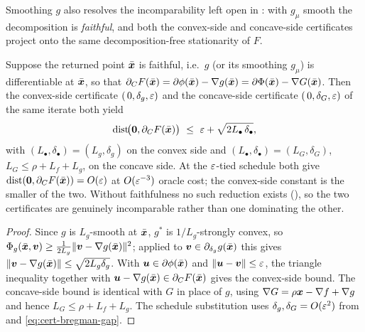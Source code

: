Smoothing $g$ also resolves the incomparability left open in
: with $g_\mu$ smooth the decomposition is
\emph{faithful}, and both the convex-side and concave-side certificates
project onto the same decomposition-free stationarity of $F$.

\begin{corollary}
\label{cor:decomp-free-clarke}
Suppose the returned point $\bar{\bm{x}}$ is faithful, i.e.\ $g$ (or its
smoothing $g_\mu$) is differentiable at $\bar{\bm{x}}$, so that
$\partial_C F(\bar{\bm{x}})=\partial\phi(\bar{\bm{x}})-\nabla g(\bar{\bm{x}})
=\partial\Phi(\bar{\bm{x}})-\nabla G(\bar{\bm{x}})$. Then the convex-side certificate
$(\,0,\delta_g,\varepsilon)$ and the concave-side certificate $(\,0,\delta_G,\varepsilon)$
of the same iterate both yield
\[
    \operatorname{dist}\!\bigl(\bm{0},\partial_C F(\bar{\bm{x}})\bigr)
    \ \le\
    \varepsilon+\sqrt{2L_\bullet\,\delta_\bullet},
\]
with $(L_\bullet,\delta_\bullet)=(L_g,\delta_g)$ on the convex side and
$(L_\bullet,\delta_\bullet)=(L_G,\delta_G)$, $L_G\le\rho+L_f+L_g$, on the
concave side. At the $\varepsilon$-tied schedule both give
$\operatorname{dist}(\bm{0},\partial_C F(\bar{\bm{x}}))=O(\varepsilon)$ at $O(\varepsilon^{-3})$
oracle cost; the convex-side constant is the smaller of the two. Without
faithfulness no such reduction exists
(), so the two certificates are
genuinely incomparable rather than one dominating the other.
\end{corollary}

\begin{proof}
Since $g$ is $L_g$-smooth at $\bar{\bm{x}}$, $g^*$ is $1/L_g$-strongly convex,
so $\Phi_g(\bar{\bm{x}},\bm{v})\ge\tfrac1{2L_g}\lVert \bm{v}-\nabla g(\bar{\bm{x}})\rVert^2$;
applied to $\bm{v}\in\partial_{\delta_g}g(\bar{\bm{x}})$ this gives
$\lVert \bm{v}-\nabla g(\bar{\bm{x}})\rVert\le\sqrt{2L_g\delta_g}$. With
$\bm{u}\in\partial\phi(\bar{\bm{x}})$ and $\lVert \bm{u}-\bm{v}\rVert\le\varepsilon$, the triangle
inequality together with $\bm{u}-\nabla g(\bar{\bm{x}})\in\partial_C F(\bar{\bm{x}})$
gives the convex-side bound. The concave-side bound is identical with $G$
in place of $g$, using $\nabla G=\rho\bm{x}-\nabla f+\nabla g$ and hence
$L_G\le\rho+L_f+L_g$. The schedule substitution uses
$\delta_g,\delta_G=O(\varepsilon^2)$ from
 and
\eqref{eq:cert-bregman-gap}.
\end{proof}

